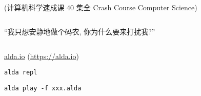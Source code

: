 \begin{frame}{}
  \begin{center}

    \pause
    \vspace{0.80cm}
      \\[8pt]
    (计算机科学速成课 $40$ 集全 Crash Course Computer Science)

    \vspace{0.80cm}
    \begin{columns}
        \pause
        \pause
        \pause
    \end{columns}
  \end{center}
\end{frame}

\begin{frame}{}
  \begin{center}
    ``我只想安静地做个码农, 你为什么要来打扰我?''
  \end{center}

  \begin{columns}
  \end{columns}
\end{frame}

\begin{frame}{}
\end{frame}

\begin{frame}{}
  \begin{center}
    \href{https://alda.io/}{alda.io} \quad (\url{https://alda.io})


    \texttt{alda repl}

    \vspace{0.20cm}
    \texttt{alda play -f xxx.alda}
  \end{center}
\end{frame}

